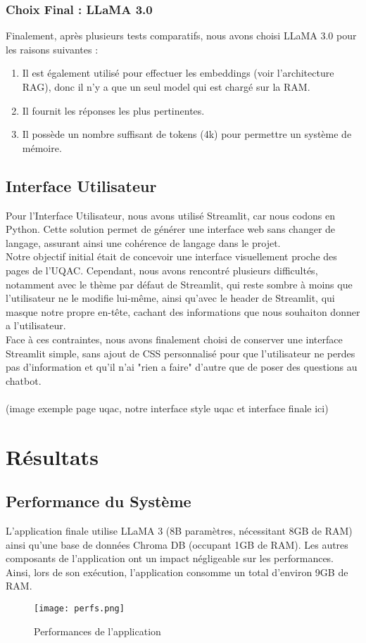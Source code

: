 \documentclass{article}
\begin{document}
    \subsubsection{Choix Final : LLaMA 3.0}
    Finalement, après plusieurs tests comparatifs, nous avons choisi LLaMA 3.0 pour les raisons suivantes :
    \begin{enumerate}
        \item Il est également utilisé pour effectuer les embeddings (voir l'architecture RAG), donc il n'y a que un seul model qui est chargé sur la RAM.
        \item Il fournit les réponses les plus pertinentes.
        \item Il possède un nombre suffisant de tokens (4k) pour permettre un système de mémoire.
    \end{enumerate}

\subsection{Interface Utilisateur}
\quad Pour l'Interface Utilisateur, nous avons utilisé Streamlit, car nous codons en Python. Cette solution permet de générer une interface web sans changer de langage, assurant ainsi une cohérence de langage dans le projet.\\

Notre objectif initial était de concevoir une interface visuellement proche des pages de l'UQAC. Cependant, nous avons rencontré plusieurs difficultés, notamment avec le thème par défaut de Streamlit, qui reste sombre à moins que l'utilisateur ne le modifie lui-même, ainsi qu'avec le header de Streamlit, qui masque notre propre en-tête, cachant des informations que nous souhaiton donner a l'utilisateur.\\

Face à ces contraintes, nous avons finalement choisi de conserver une interface Streamlit simple, sans ajout de CSS personnalisé pour que l'utilisateur ne perdes pas d'information et qu'il n'ai "rien a faire" d'autre que de poser des questions au chatbot.\\
\\
(image exemple page uqac, notre interface style uqac et interface finale ici)

\clearpage

\section{Résultats}
\subsection{Performance du Système}
\quad L'application finale utilise LLaMA 3 (8B paramètres, nécessitant 8GB de RAM) ainsi qu'une base de données Chroma DB (occupant 1GB de RAM). Les autres composants de l'application ont un impact négligeable sur les performances. Ainsi, lors de son exécution, l'application consomme un total d'environ 9GB de RAM.
\begin{figure}[ht]
    \centering
    \texttt{[image: perfs.png]}
    \caption{Performances de l'application}
\end{figure}
\end{document}
